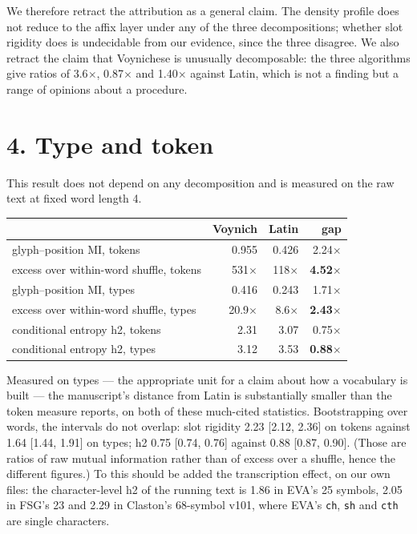 \documentclass[11pt,a4paper]{article}
\begin{document}
We therefore retract the attribution as a general claim. The density profile does not reduce to the affix layer under any of the three decompositions; whether slot rigidity does is undecidable from our evidence, since the three disagree. We also retract the claim that Voynichese is unusually decomposable: the three algorithms give ratios of 3.6$\times$, 0.87$\times$ and 1.40$\times$ against Latin, which is not a finding but a range of opinions about a procedure.

\section*{4. Type and token}


This result does not depend on any decomposition and is measured on the raw text at fixed word length 4.


\begin{table}[htbp]\centering\small
\begin{tabular}{@{}lrrr@{}}
\toprule
 & Voynich & Latin & gap \\
\midrule
glyph--position MI, tokens & 0.955 & 0.426 & 2.24$\times$ \\
excess over within-word shuffle, tokens & 531$\times$ & 118$\times$ & \textbf{4.52$\times$} \\
glyph--position MI, types & 0.416 & 0.243 & 1.71$\times$ \\
excess over within-word shuffle, types & 20.9$\times$ & 8.6$\times$ & \textbf{2.43$\times$} \\
conditional entropy h2, tokens & 2.31 & 3.07 & 0.75$\times$ \\
conditional entropy h2, types & 3.12 & 3.53 & \textbf{0.88$\times$} \\
\bottomrule
\end{tabular}
\end{table}


Measured on types --- the appropriate unit for a claim about how a vocabulary is built --- the manuscript's distance from Latin is substantially smaller than the token measure reports, on both of these much-cited statistics. Bootstrapping over words, the intervals do not overlap: slot rigidity 2.23 [2.12, 2.36] on tokens against 1.64 [1.44, 1.91] on types; h2 0.75 [0.74, 0.76] against 0.88 [0.87, 0.90]. (Those are ratios of raw mutual information rather than of excess over a shuffle, hence the different figures.) To this should be added the transcription effect, on our own files: the character-level h2 of the running text is 1.86 in EVA's 25 symbols, 2.05 in FSG's 23 and 2.29 in Claston's 68-symbol v101, where EVA's \texttt{ch}, \texttt{sh} and \texttt{cth} are single characters.
\end{document}
